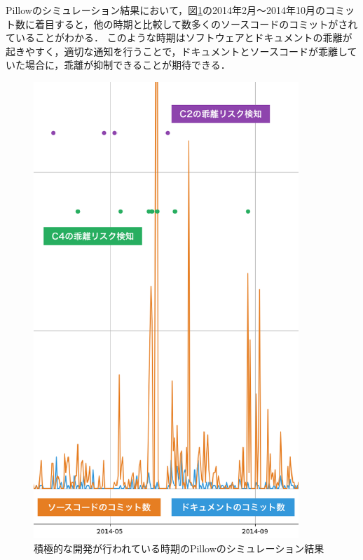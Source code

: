 Pillowのシミュレーション結果において，図\ref{simpillow}の2014年2月〜2014年10月のコミット数に着目すると，他の時期と比較して数多くのソースコードのコミットがされていることがわかる．
このような時期はソフトウェアとドキュメントの乖離が起きやすく，適切な通知を行うことで，ドキュメントとソースコードが乖離していた場合に，乖離が抑制できることが期待できる．
\begin{figure}[H]
    \centering
    \includegraphics[width=10cm]{images/pillow.png}
    \caption{積極的な開発が行われている時期のPillowのシミュレーション結果}
    \label{simpillow}
\end{figure}

